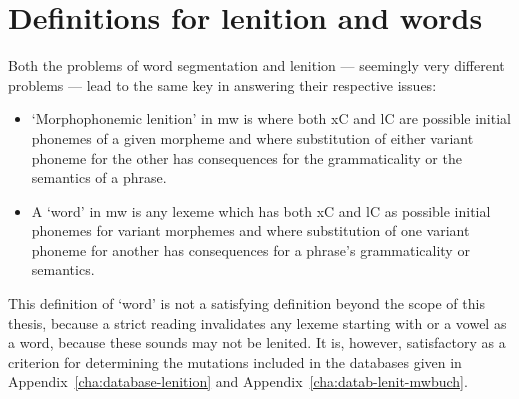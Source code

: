 \section{Definitions for lenition and words}

Both the problems of word segmentation and lenition --- seemingly very different problems --- lead to the same key in answering their respective issues: 
\begin{itemize}
\item `Morphophonemic lenition' in \gls{mw} is where both \gls{x}\gls{C}  and \gls{l}\gls{C} are possible initial phonemes of a given morpheme and where  substitution of either variant phoneme for the other has consequences for the grammaticality or the semantics of a phrase.
\item A `word' in \gls{mw} is any lexeme which has both \gls{x}\gls{C} and \gls{l}\gls{C} as possible initial phonemes for variant morphemes and where  substitution of one variant phoneme for another has consequences for a phrase's grammaticality or semantics.
\end{itemize}
This definition of `word' is not a satisfying definition beyond the scope of this thesis, because a strict reading  invalidates any lexeme starting with  or a vowel as a word, because these sounds may not be lenited. It is, however, satisfactory as a criterion for determining the mutations included in the databases  given in Appendix~\ref{cha:database-lenition} and Appendix~\ref{cha:datab-lenit-mwbuch}.


